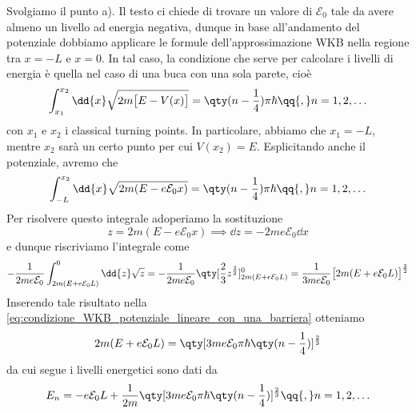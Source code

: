 \begin{soluzione}
  Svolgiamo il punto a). Il testo ci chiede di trovare un valore di $\mathcal{E}_0$ tale da avere almeno un livello ad energia negativa, dunque in base all'andamento del potenziale dobbiamo applicare le formule dell'approssimazione WKB nella regione tra $x=-L$ e $x=0$. In tal caso, la condizione che serve per calcolare i livelli di energia è quella nel caso di una buca con una sola parete, cioè
   \begin{equation*}
      \int_{x_1}^{x_2} \dd{x} \sqrt{2m \bigl[ E - V(x) \bigr]}
      =\qty( n - \frac{1}{4} )\pi \hbar
      \qq{,}
      n=1,2,\ldots
   \end{equation*}
   con $x_1$ e $x_2$ i classical turning points. In particolare, abbiamo che $x_1=-L$, mentre $x_2$ sarà un certo punto per cui $V(x_2)=E$. Esplicitando anche il potenziale, avremo che
   \begin{equation}
      \int_{-L}^{x_2} \dd{x} \sqrt{2m ( E - e \mathcal{E}_0 x )}
      =\qty( n - \frac{1}{4} )\pi \hbar
      \qq{,}
      n=1,2,\ldots
      \label{eq:condizione_WKB_potenziale_lineare_con_una_barriera}
   \end{equation}
   Per risolvere questo integrale adoperiamo la sostituzione
   \begin{equation*}
      z=2m ( E - e \mathcal{E}_0 x )
      \implies
      \dd{z}
      =-2m e \mathcal{E}_0 \dd{x}
   \end{equation*}
   e dunque riscriviamo l'integrale come
   \begin{equation*}
      -\frac{1}{2 m e \mathcal{E}_0} \int_{2m(E + e \mathcal{E}_0 L)}^{0} \dd{z} \sqrt{z}
      =-\frac{1}{2 m e \mathcal{E}_0} \qty[ \frac{2}{3} z^{\frac{3}{2}} ]_{2m(E + e \mathcal{E}_0 L)}^{0}
      =\frac{1}{3 m e \mathcal{E}_0} \bigl[ 2m(E + e \mathcal{E}_0 L) \bigr]^{\frac{3}{2}}
   \end{equation*}
   Inserendo tale risultato nella \eqref{eq:condizione_WKB_potenziale_lineare_con_una_barriera} otteniamo
   \begin{equation*}
      2m(E + e \mathcal{E}_0 L)
      =\qty[ 3 m e \mathcal{E}_0 \pi \hbar \qty( n - \frac{1}{4} ) ]^{\frac{2}{3}}
   \end{equation*}
   da cui segue i livelli energetici sono dati da
   \begin{equation*}
      E_n
      =-e \mathcal{E}_0 L + \frac{1}{2m} \qty[ 3 m e \mathcal{E}_0 \pi \hbar \qty( n - \frac{1}{4} ) ]^{\frac{2}{3}}
      \qq{,}
      n=1,2,\ldots
   \end{equation*}

\end{soluzione}
